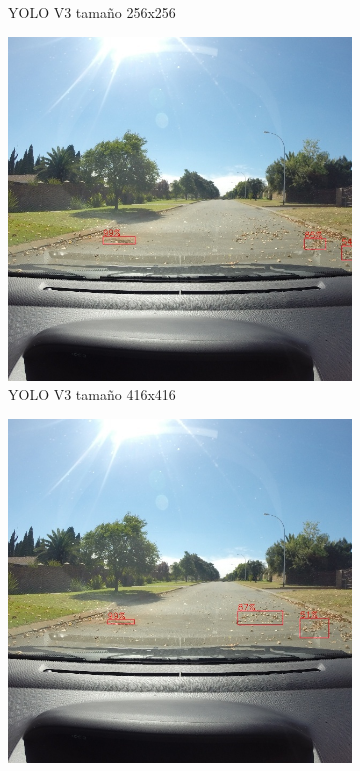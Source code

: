 \begin{figure}[H]
\begin{subfigure}[h]{0.45\linewidth}
		\caption{YOLO V3 tamaño 256x256}
	\end{subfigure}
	\begin{subfigure}[h]{0.45\linewidth}
		\includegraphics[width=\linewidth]{images/results_f_yolo_v3_416.jpg}
		\caption{YOLO V3 tamaño 416x416}
	\end{subfigure}
	\begin{subfigure}[h]{0.45\linewidth}
		\includegraphics[width=\linewidth]{images/results_f_yolo_v3_640.jpg}

\end{subfigure}
\end{figure}

